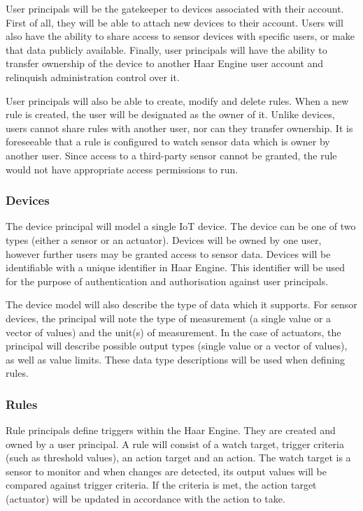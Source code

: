         User principals will be the gatekeeper to devices associated with their account. First of all, they will be able to attach new devices to their account. Users will also have the ability to share access to sensor devices with specific users, or make that data publicly available. Finally, user principals will have the ability to transfer ownership of the device to another Haar Engine user account and relinquish administration control over it.

        User principals will also be able to create, modify and delete rules. When a new rule is created, the user will be designated as the owner of it. Unlike devices, users cannot share rules with another user, nor can they transfer ownership. It is foreseeable that a rule is configured to watch sensor data which is owner by another user. Since access to a third-party sensor cannot be granted, the rule would not have appropriate access permissions to run.

      \subsubsection{Devices}
        The device principal will model a single IoT device. The device can be one of two types (either a sensor or an actuator). Devices will be owned by one user, however further users may be granted access to sensor data. Devices will be identifiable with a unique identifier in Haar Engine. This identifier will be used for the purpose of authentication and authorisation against user principals.

        The device model will also describe the type of data which it supports. For sensor devices, the principal will note the type of measurement (a single value or a vector of values) and the unit(s) of measurement. In the case of actuators, the principal will describe possible output types (single value or a vector of values), as well as value limits. These data type descriptions will be used when defining rules.

      \subsubsection{Rules}
        Rule principals define triggers within the Haar Engine. They are created and owned by a user principal. A rule will consist of a watch target, trigger criteria (such as threshold values), an action target and an action. The watch target is a sensor to monitor and when changes are detected, its output values will be compared against trigger criteria. If the criteria is met, the action target (actuator) will be updated in accordance with the action to take.

